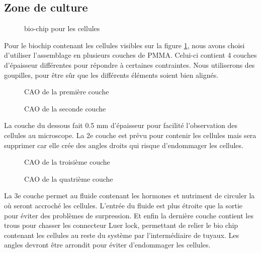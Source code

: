 \documentclass[a4paper, 11pt]{article}
\begin{document}
\subsection{Zone de culture}
\begin{figure}[H]
    \centering
    \caption{bio-chip pour les cellules}
    \label{fig:CAO_cellule}
\end{figure}
Pour le biochip contenant les cellules visibles sur la figure \ref{fig:CAO_cellule}, nous avons choisi d'utiliser l'assemblage en plusieurs couches de PMMA.
Celui-ci contient 4 couches d'épaisseur différentes pour répondre à certaines contraintes.
Nous utiliserons des goupilles, pour être sûr que les différents éléments soient bien alignés.
\begin{multicols}{2}
    \begin{figure}[H]
        \centering
        \caption{CAO de la première couche}
        \label{fig:CAO_cellule_couche1}
    \end{figure}
    \begin{figure}[H]
        \centering
        \caption{CAO de la seconde couche}
        \label{fig:CAO_cellule_couche2}
    \end{figure}
\end{multicols}
La couche du dessous fait 0.5 mm d'épaisseur pour facilité l'observation des cellules au microscope.
La 2e couche est prévu pour contenir les cellules mais sera supprimer car elle crée des angles droits qui risque d'endommager les cellules.
\begin{multicols}{2}
    \begin{figure}[H]
        \centering
        \caption{CAO de la troisième couche}
        \label{fig:CAO_cellule_couche3}
    \end{figure}
    \begin{figure}[H]
        \centering
        \caption{CAO de la quatrième couche}
        \label{fig:CAO_cellule_couche4}
    \end{figure}
\end{multicols}
La 3e couche permet au fluide contenant les hormones et nutriment de circuler la où seront accroché les cellules.
L'entrée du fluide est plus étroite que la sortie pour éviter des problèmes de surpression.
Et enfin la dernière couche contient les trous pour chasser les connecteur Luer lock, permettant de relier le bio chip contenant les cellules au reste du système par l'intermédiaire de tuyaux.
Les angles devront être arrondit pour éviter d'endommager les cellules.
\end{document}
